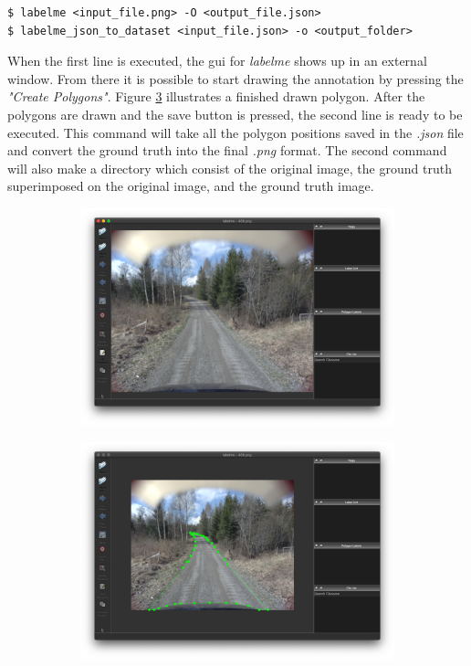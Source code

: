 \documentclass[USenglish]{ifimaster}  %
\begin{document}
\begin{verbatim}
$ labelme <input_file.png> -O <output_file.json>
$ labelme_json_to_dataset <input_file.json> -o <output_folder>
\end{verbatim}

When the first line is executed, the \ac{gui} for \textit{labelme} shows up in an external window. From there it is possible to start drawing the annotation by pressing the \textit{"Create Polygons"}. Figure \cref{fig:polygon} illustrates a finished drawn polygon. After the polygons are drawn and the save button is pressed, the second line is ready to be executed. This command will take all the polygon positions saved in the \textit{.json} file and convert the ground truth into the final \textit{.png} format. The second command will also make a directory which consist of the original image, the ground truth superimposed on the original image, and the ground truth image. 

\begin{figure}[ht]
\begin{subfigure}{.6\textwidth}
\includegraphics[width=.75\linewidth]{bilder/labelme_gui.png}
\label{fig:gui}
\end{subfigure}
\begin{subfigure}{.6\textwidth}
\includegraphics[width=.75\linewidth]{bilder/annotating.png}
\label{fig:polygon}
\end{subfigure}
\end{figure}
\end{document}
